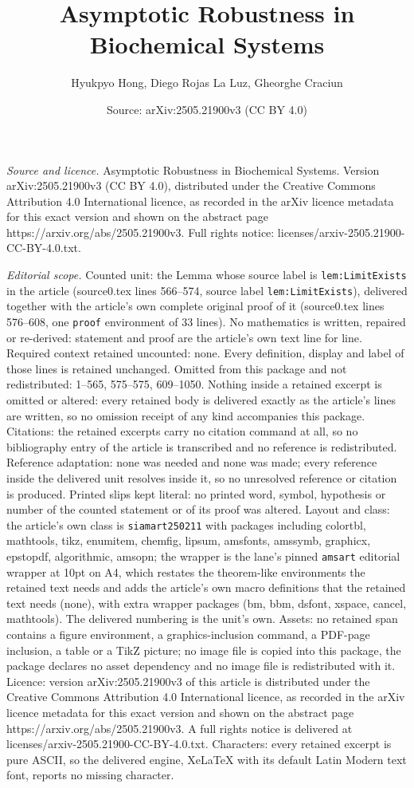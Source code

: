 \documentclass[10pt,a4paper]{amsart}
\title[Asymptotic Robustness in Biochemical Systems]{Asymptotic Robustness in Biochemical Systems}
\author{Hyukpyo Hong, Diego Rojas La Luz, Gheorghe Craciun}
\date{Source: arXiv:2505.21900v3 (CC BY 4.0)}
\begin{document}
\maketitle

\noindent\emph{Source and licence.} Asymptotic Robustness in Biochemical Systems. Version arXiv:2505.21900v3 (CC BY 4.0), distributed under the Creative Commons Attribution 4.0 International licence, as recorded in the arXiv licence metadata for this exact version and shown on the abstract page https://arxiv.org/abs/2505.21900v3. Full rights notice: licenses/arxiv-2505.21900-CC-BY-4.0.txt.\par\smallskip

\noindent\textit{Editorial scope.} Counted unit: the Lemma whose source label is \texttt{lem:LimitExists} in the article (source0.tex lines 566--574, source label \texttt{lem:LimitExists}), delivered together with the article's own complete original proof of it (source0.tex lines 576--608, one \texttt{proof} environment of 33 lines). No mathematics is written, repaired or re-derived: statement and proof are the article's own text line for line. Required context retained uncounted: none. Every definition, display and label of those lines is retained unchanged. Omitted from this package and not redistributed: 1--565, 575--575, 609--1050. Nothing inside a retained excerpt is omitted or altered: every retained body is delivered exactly as the article's lines are written, so no omission receipt of any kind accompanies this package. Citations: the retained excerpts carry no citation command at all, so no bibliography entry of the article is transcribed and no reference is redistributed. Reference adaptation: none was needed and none was made; every reference inside the delivered unit resolves inside it, so no unresolved reference or citation is produced. Printed slips kept literal: no printed word, symbol, hypothesis or number of the counted statement or of its proof was altered. Layout and class: the article's own class is \texttt{siamart250211} with packages including colortbl, mathtools, tikz, enumitem, chemfig, lipsum, amsfonts, amssymb, graphicx, epstopdf, algorithmic, amsopn; the wrapper is the lane's pinned \texttt{amsart} editorial wrapper at 10pt on A4, which restates the theorem-like environments the retained text needs and adds the article's own macro definitions that the retained text needs (none), with extra wrapper packages (bm, bbm, dsfont, xspace, cancel, mathtools). The delivered numbering is the unit's own. Assets: no retained span contains a figure environment, a graphics-inclusion command, a PDF-page inclusion, a table or a TikZ picture; no image file is copied into this package, the package declares no asset dependency and no image file is redistributed with it. Licence: version arXiv:2505.21900v3 of this article is distributed under the Creative Commons Attribution 4.0 International licence, as recorded in the arXiv licence metadata for this exact version and shown on the abstract page https://arxiv.org/abs/2505.21900v3. A full rights notice is delivered at licenses/arxiv-2505.21900-CC-BY-4.0.txt. Characters: every retained excerpt is pure ASCII, so the delivered engine, XeLaTeX with its default Latin Modern text font, reports no missing character.
\end{document}
